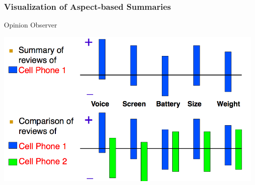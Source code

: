 \documentclass[t]{beamer}
\begin{document}
\begin{frame} \frametitle{Visualization of Aspect-based Summaries} %


\begin{block}{Opinion Observer} %

\begin{center}
     \includegraphics[width=\textwidth]{opinion-observer}
\end{center}

\end{block}

\end{frame} 
\end{document}

